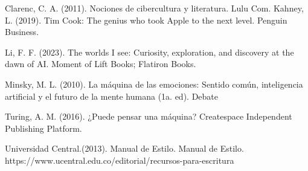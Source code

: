 \documentclass[runningheads]{llncs}
\begin{document}
\begin{thebibliography}{8}
Clarenc, C. A. (2011). Nociones de cibercultura y literatura. Lulu Com. 
Kahney, L. (2019). Tim Cook: The genius who took Apple to the next level. Penguin 
Business. 

Li, F. F. (2023). The worlds I see: Curiosity, exploration, and discovery at the dawn of AI. Moment of Lift Books; Flatiron Books.

Minsky, M. L. (2010). La máquina de las emociones: Sentido común, inteligencia artificial y el futuro de la mente humana (1a. ed). Debate

Turing, A.  M.  (2016).  ¿Puede pensar una máquina?  Createspace  Independent 
Publishing Platform. 

Universidad     
Central.(2013). Manual     de     Estilo.     Manual     de     Estilo. 
https://www.ucentral.edu.co/editorial/recursos-para-escritura
\end{thebibliography}
\end{document}
